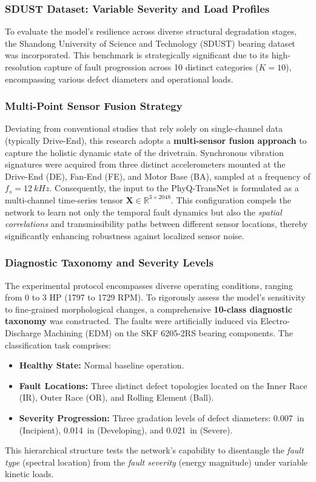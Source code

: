 \documentclass[5p,times,twocolumn]{elsarticle}
\begin{document}
\subsubsection{SDUST Dataset: Variable Severity and Load Profiles}
To evaluate the model's resilience across diverse structural degradation stages, the Shandong University of Science and Technology (SDUST) bearing dataset was incorporated. This benchmark is strategically significant due to its high-resolution capture of fault progression across 10 distinct categories ($K=10$), encompassing various defect diameters and operational loads. 

\subsubsection{Multi-Point Sensor Fusion Strategy}


Deviating from conventional studies that rely solely on single-channel data (typically Drive-End), this research adopts a \textbf{multi-sensor fusion approach} to capture the holistic dynamic state of the drivetrain. Synchronous vibration signatures were acquired from three distinct accelerometers mounted at the Drive-End (DE), Fan-End (FE), and Motor Base (BA), sampled at a frequency of $f_s = \SI{12}{kHz}$. 
Consequently, the input to the PhyQ-TransNet is formulated as a multi-channel time-series tensor $\mathbf{X} \in \mathbb{R}^{3 \times 2048}$. This configuration compels the network to learn not only the temporal fault dynamics but also the \textit{spatial correlations} and transmissibility paths between different sensor locations, thereby significantly enhancing robustness against localized sensor noise.

\subsubsection{Diagnostic Taxonomy and Severity Levels}
The experimental protocol encompasses diverse operating conditions, ranging from 0 to 3 HP (1797 to 1729 RPM). To rigorously assess the model's sensitivity to fine-grained morphological changes, a comprehensive \textbf{10-class diagnostic taxonomy} was constructed. 
The faults were artificially induced via Electro-Discharge Machining (EDM) on the SKF 6205-2RS bearing components. The classification task comprises:
\begin{itemize}
    \item \textbf{Healthy State:} Normal baseline operation.
    \item \textbf{Fault Locations:} Three distinct defect topologies located on the Inner Race (IR), Outer Race (OR), and Rolling Element (Ball).
    \item \textbf{Severity Progression:} Three gradation levels of defect diameters: \SI{0.007}{in} (Incipient), \SI{0.014}{in} (Developing), and \SI{0.021}{in} (Severe).
\end{itemize}
This hierarchical structure tests the network's capability to disentangle the \textit{fault type} (spectral location) from the \textit{fault severity} (energy magnitude) under variable kinetic loads.
\end{document}
